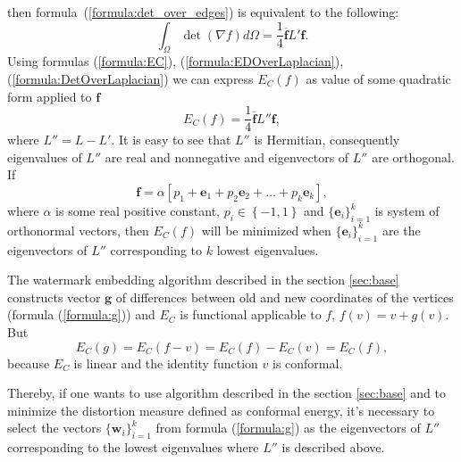 \documentclass{article}
\newcommand{\conjugate}{\overline}
\begin{document}
then formula~(\ref{formula:det_over_edges}) is equivalent to the following:
\begin{equation}
\label{formula:DetOverLaplacian}
  \int_{\Omega} \det {\left( \nabla f \right) } d\Omega = \frac{1}{4} \conjugate{\mathbf{f}} L' \mathbf{f}.
\end{equation}
Using formulas (\ref{formula:EC}), (\ref{formula:EDOverLaplacian}), (\ref{formula:DetOverLaplacian}) we can express $E_C(f)$ as value of some quadratic form applied to $\mathbf{f}$
\begin{equation*}
  E_C(f) = \frac{1}{4}\conjugate{\mathbf{f}} L'' \mathbf{f},
\end{equation*}
where $L'' = L - L'$. It is easy to see that $L''$ is Hermitian, consequently eigenvalues of $L''$ are real and nonnegative and eigenvectors of $L''$ are orthogonal.
If $$\mathbf{f} = \alpha \left[ p_1 + \mathbf{e}_1 + p_2 \mathbf{e}_2 + \dots + p_k \mathbf{e}_k \right],$$ where $\alpha$ is some real positive constant, $p_i \in \left\{-1, 1 \right\}$ 
and $\{\mathbf{e}_i\}_{i=1}^k$ is system of orthonormal vectors, then $E_C(f)$ will be minimized when $\{\mathbf{e}_i\}_{i=1}^k$ are the eigenvectors of $L''$ corresponding to $k$ lowest eigenvalues. 

The watermark embedding algorithm described in the section \ref{sec:base} constructs vector $\mathbf{g}$ of differences between old and new coordinates of the vertices (formula (\ref{formula:g})) and $E_C$ is functional 
applicable to $f$, $f(v) = v + g(v)$. But $$E_C(g) = E_C(f - v) = E_C(f) - E_C(v) = E_C(f),$$ because $E_C$ is linear and the identity function $v$ is conformal. 

Thereby, if one wants to use algorithm described in the section \ref{sec:base} and to minimize the distortion measure defined as conformal energy, it's necessary to select the vectors $\{\mathbf{w}_i\}_{i=1}^k$ 
from formula (\ref{formula:g}) as the eigenvectors of $L''$ corresponding to the lowest eigenvalues where $L''$ is described above.
\end{document}
